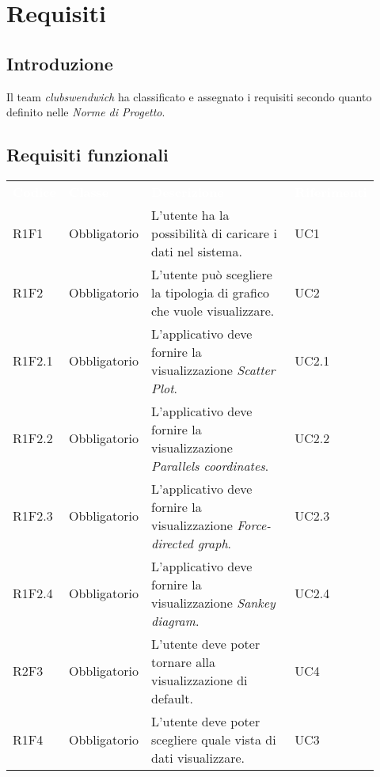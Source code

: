 \section{Requisiti}
\subsection{Introduzione}
Il team \textit{clubswendwich} ha classificato e assegnato i requisiti secondo quanto definito nelle \textit{Norme di Progetto}. 
\subsection{Requisiti funzionali}
{\renewcommand{\arraystretch}{1.5}
\begin{longtable}{p{0.12\linewidth}p{0.15\linewidth}p{0.50\linewidth}p{0.15\linewidth}}
	\rowcolor[RGB]{33, 73, 50}
	\textcolor{white}{\textbf{Codice}} & \textcolor{white}{\textbf{Classe}} & \textcolor{white}{\textbf{Descrizione}} &
    \textcolor{white}{\textbf{Riferimenti}}\\
    \rowcolor[RGB]{216, 235, 171}
    R1F1 & Obbligatorio & L'utente ha la possibilità di caricare i dati nel sistema. & UC1\\
    
    \rowcolor[RGB]{233, 245, 206}
    R1F2 & Obbligatorio & L'utente può scegliere la tipologia di grafico che vuole visualizzare. & UC2\\
    \rowcolor[RGB]{216, 235, 171}
    R1F2.1 & Obbligatorio & L'applicativo deve fornire la visualizzazione \textit{Scatter Plot}. & UC2.1\\
    \rowcolor[RGB]{233, 245, 206}
    R1F2.2 & Obbligatorio & L'applicativo deve fornire la visualizzazione \textit{Parallels coordinates}. & UC2.2\\
    \rowcolor[RGB]{216, 235, 171}
    R1F2.3 & Obbligatorio & L'applicativo deve fornire la visualizzazione \textit{Force-directed graph}. & UC2.3\\
    \rowcolor[RGB]{233, 245, 206}
    R1F2.4 & Obbligatorio & L'applicativo deve fornire la visualizzazione \textit{Sankey diagram}. & UC2.4\\
    
    \rowcolor[RGB]{216, 235, 171}
    R2F3 & Obbligatorio & L'utente deve poter tornare alla visualizzazione di default. & UC4\\
    
    \rowcolor[RGB]{233, 245, 206}
    R1F4 & Obbligatorio & L'utente deve poter scegliere quale vista di dati visualizzare. & UC3\\
    

\end{longtable}}
